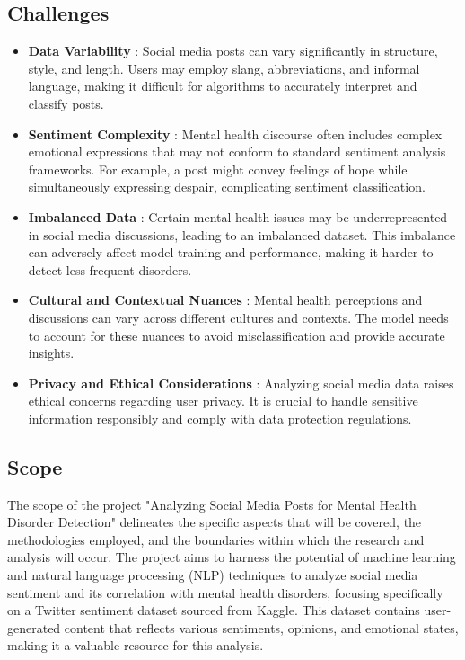 \subsection{Challenges}
\begin{itemize}
    \item \textbf{Data Variability} :
    \noindent
    Social media posts can vary significantly in structure, style, and length. Users may employ slang, abbreviations, and informal language, making it difficult for algorithms to accurately interpret and classify posts.

    \item \textbf{Sentiment Complexity} :
    \noindent
    Mental health discourse often includes complex emotional expressions that may not conform to standard sentiment analysis frameworks. For example, a post might convey feelings of hope while simultaneously expressing despair, complicating sentiment classification.

    \item \textbf{Imbalanced Data} :
    \noindent
    Certain mental health issues may be underrepresented in social media discussions, leading to an imbalanced dataset. This imbalance can adversely affect model training and performance, making it harder to detect less frequent disorders.

    \item \textbf{Cultural and Contextual Nuances} :
    \noindent
    Mental health perceptions and discussions can vary across different cultures and contexts. The model needs to account for these nuances to avoid misclassification and provide accurate insights.

    \item \textbf{Privacy and Ethical Considerations} :
    \noindent
    Analyzing social media data raises ethical concerns regarding user privacy. It is crucial to handle sensitive information responsibly and comply with data protection regulations.
    
\end{itemize}

\subsection{Scope}
\noindent
The scope of the project "Analyzing Social Media Posts for Mental Health Disorder Detection" delineates the specific aspects that will be covered, the methodologies employed, and the boundaries within which the research and analysis will occur. The project aims to harness the potential of machine learning and natural language processing (NLP) techniques to analyze social media sentiment and its correlation with mental health disorders, focusing specifically on a Twitter sentiment dataset sourced from Kaggle. This dataset contains user-generated content that reflects various sentiments, opinions, and emotional states, making it a valuable resource for this analysis.

